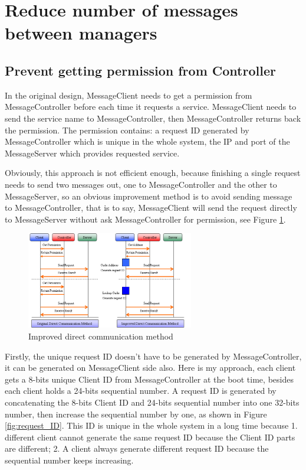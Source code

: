\documentclass[a4paper,10pt]{article}
\begin{document}
\section{Reduce number of messages between managers}

\subsection{Prevent getting permission from Controller}
In the original design, MessageClient needs to get a permission from MessageController before each time it requests a service.
MessageClient needs to send the service name to MessageController, then MessageController returns back the permission.
The permission contains: a request ID generated by MessageController which is unique in the whole system, the IP and port of the MessageServer which provides requested service.

Obviously, this approach is not efficient enough, because finishing a single request needs to send two messages out,
one to MessageController and the other to MessageServer, so an obvious improvement method is to avoid sending message to MessageController,
that is to say, MessageClient will send the request directly to MessageServer without ask MessageController for permission, see Figure \ref{fig:op_1}.

\begin{figure}[!ht]\centering
  \includegraphics[width=0.65\textwidth]{op_1.png}
  \caption{Improved direct communication method}\label{fig:op_1}
\end{figure}

Firstly, the unique request ID doesn't have to be generated by MessageController, it can be generated on MessageClient side also.
Here is my approach, each client gets a 8-bits unique Client ID from MessageController at the boot time, besides each client holds a 24-bits sequential number.
A request ID is generated by concatenating the 8-bits Client ID and 24-bits sequential number into one 32-bits number, then increase the sequential number by one, as shown in Figure \ref{fig:request_ID}.
This ID is unique in the whole system in a long time because
1. different client cannot generate the same request ID because the Client ID parts are different;
2. A client always generate different request ID because the sequential number keeps increasing.
\end{document}
